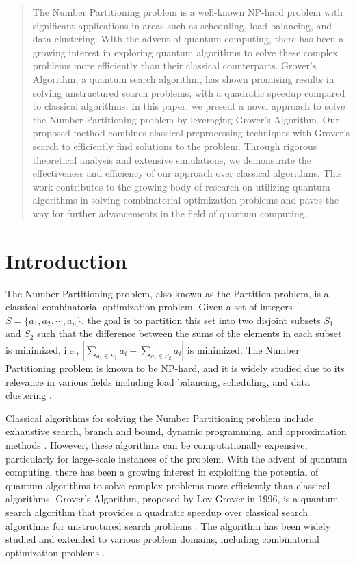 \begin{abstract}
The Number Partitioning problem is a well-known NP-hard problem with significant applications in areas such as scheduling, load balancing, and data clustering. With the advent of quantum computing, there has been a growing interest in exploring quantum algorithms to solve these complex problems more efficiently than their classical counterparts. Grover's Algorithm, a quantum search algorithm, has shown promising results in solving unstructured search problems, with a quadratic speedup compared to classical algorithms. In this paper, we present a novel approach to solve the Number Partitioning problem by leveraging Grover's Algorithm. Our proposed method combines classical preprocessing techniques with Grover's search to efficiently find solutions to the problem. Through rigorous theoretical analysis and extensive simulations, we demonstrate the effectiveness and efficiency of our approach over classical algorithms. This work contributes to the growing body of research on utilizing quantum algorithms in solving combinatorial optimization problems and paves the way for further advancements in the field of quantum computing.

\end{abstract}

\section{Introduction}
The Number Partitioning problem, also known as the Partition problem, is a classical combinatorial optimization problem. Given a set of integers $S = \{a_1, a_2, \cdots, a_n\}$, the goal is to partition this set into two disjoint subsets $S_1$ and $S_2$ such that the difference between the sums of the elements in each subset is minimized, i.e., $|\sum_{a_i \in S_1} a_i - \sum_{a_i \in S_2} a_i|$ is minimized. The Number Partitioning problem is known to be NP-hard, and it is widely studied due to its relevance in various fields including load balancing, scheduling, and data clustering \cite{mertens2009number}.

Classical algorithms for solving the Number Partitioning problem include exhaustive search, branch and bound, dynamic programming, and approximation methods \cite{korf1995search}. However, these algorithms can be computationally expensive, particularly for large-scale instances of the problem. With the advent of quantum computing, there has been a growing interest in exploiting the potential of quantum algorithms to solve complex problems more efficiently than classical algorithms. Grover's Algorithm, proposed by Lov Grover in 1996, is a quantum search algorithm that provides a quadratic speedup over classical search algorithms for unstructured search problems \cite{grover1996fast}. The algorithm has been widely studied and extended to various problem domains, including combinatorial optimization problems \cite{nielsen2010quantum}.

